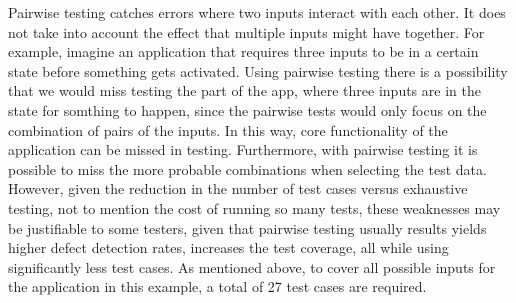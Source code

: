 Pairwise testing catches errors where two inputs interact with each other.
It does not take into account the effect that multiple inputs might have 
together. For example, imagine an application that requires three inputs to
be in a certain state before something gets activated. Using pairwise testing
there is a possibility that we would miss testing the part of the app,
where three inputs are in the state for somthing to happen, since
the pairwise tests would only focus on the combination of pairs of the inputs.
In this way, core functionality of the application can be missed in testing.
Furthermore, with pairwise testing it is possible to miss the more 
probable combinations when selecting the test data. However, given the reduction
in the number of test cases versus exhaustive testing, not to mention the
cost of running so many tests, these weaknesses may be justifiable to some
testers, given that pairwise testing usually results yields higher defect
detection rates, increases the test coverage, all while using significantly
less test cases. As mentioned above, to cover all possible inputs for the
application in this example, a total of 27 test cases are required. 


